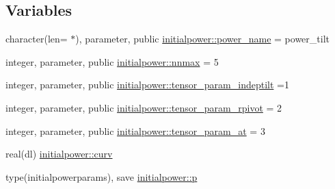 \subsection*{Variables}
\begin{DoxyCompactItemize}
\item 
character(len= $\ast$), parameter, public \mbox{\hyperlink{namespaceinitialpower_a5397e53840b8c5aa10ab09fcd8cb23b4}{initialpower\+::power\+\_\+name}} = \textquotesingle{}power\+\_\+tilt\textquotesingle{}
\item 
integer, parameter, public \mbox{\hyperlink{namespaceinitialpower_a9749c023ff83f7ffa2677dc578379c10}{initialpower\+::nnmax}} = 5
\item 
integer, parameter, public \mbox{\hyperlink{namespaceinitialpower_a08c3c750bc5c8657967d99b3f0b9585e}{initialpower\+::tensor\+\_\+param\+\_\+indeptilt}} =1
\item 
integer, parameter, public \mbox{\hyperlink{namespaceinitialpower_a610fa4412cca71c3692bd468cd0df5ec}{initialpower\+::tensor\+\_\+param\+\_\+rpivot}} = 2
\item 
integer, parameter, public \mbox{\hyperlink{namespaceinitialpower_a1ab75aba3a08150a1e0c54913880e1be}{initialpower\+::tensor\+\_\+param\+\_\+at}} = 3
\item 
real(dl) \mbox{\hyperlink{namespaceinitialpower_a3a06e0904c8fdd21de5ce19490bb177b}{initialpower\+::curv}}
\item 
type(initialpowerparams), save \mbox{\hyperlink{namespaceinitialpower_ace8ec05c677782ea3843bc3e85b6f42d}{initialpower\+::p}}
\end{DoxyCompactItemize}
